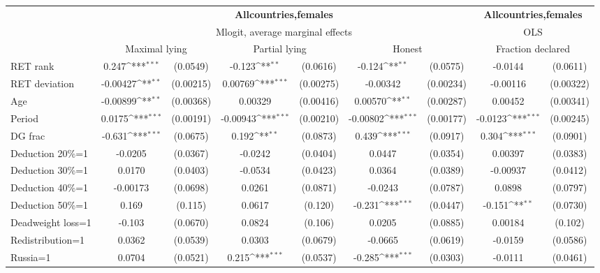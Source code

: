 \def\sym#1{\ifmmode^{#1}\else\(^{#1}\)\fi}
\begin{tabular}{l|cccccc|cc}
\hline\hline
&\multicolumn{6}{c|}{\bf All\space{}countries,\space{}females}&\multicolumn{2}{c}{\bf All\space{}countries,\space{}females}\\ &\multicolumn{6}{c|}{Mlogit, average marginal effects }&\multicolumn{2}{c}{OLS}\\
                &\multicolumn{2}{c}{Maximal lying}&\multicolumn{2}{c}{Partial lying}&\multicolumn{2}{c}{Honest}  &\multicolumn{2}{c}{Fraction declared}\\
\hline
RET rank        &    0.247\sym{***}& (0.0549)&   -0.123\sym{**} & (0.0616)&   -0.124\sym{**} & (0.0575)&  -0.0144         & (0.0611)\\
RET deviation   & -0.00427\sym{**} &(0.00215)&  0.00769\sym{***}&(0.00275)& -0.00342         &(0.00234)& -0.00116         &(0.00322)\\
Age             & -0.00899\sym{**} &(0.00368)&  0.00329         &(0.00416)&  0.00570\sym{**} &(0.00287)&  0.00452         &(0.00341)\\
Period          &   0.0175\sym{***}&(0.00191)& -0.00943\sym{***}&(0.00210)& -0.00802\sym{***}&(0.00177)&  -0.0123\sym{***}&(0.00245)\\
DG frac         &   -0.631\sym{***}& (0.0675)&    0.192\sym{**} & (0.0873)&    0.439\sym{***}& (0.0917)&    0.304\sym{***}& (0.0901)\\
Deduction 20\%=1&  -0.0205         & (0.0367)&  -0.0242         & (0.0404)&   0.0447         & (0.0354)&  0.00397         & (0.0383)\\
Deduction 30\%=1&   0.0170         & (0.0403)&  -0.0534         & (0.0423)&   0.0364         & (0.0389)& -0.00937         & (0.0412)\\
Deduction 40\%=1& -0.00173         & (0.0698)&   0.0261         & (0.0871)&  -0.0243         & (0.0787)&   0.0898         & (0.0797)\\
Deduction 50\%=1&    0.169         &  (0.115)&   0.0617         &  (0.120)&   -0.231\sym{***}& (0.0447)&   -0.151\sym{**} & (0.0730)\\
Deadweight loss=1&   -0.103         & (0.0670)&   0.0824         &  (0.106)&   0.0205         & (0.0885)&  0.00184         &  (0.102)\\
Redistribution=1&   0.0362         & (0.0539)&   0.0303         & (0.0679)&  -0.0665         & (0.0619)&  -0.0159         & (0.0586)\\
Russia=1        &   0.0704         & (0.0521)&    0.215\sym{***}& (0.0537)&   -0.285\sym{***}& (0.0303)&  -0.0111         & (0.0461)\\

\end{tabular}
